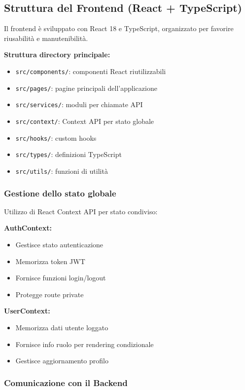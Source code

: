 \documentclass{report}
\begin{document}
\subsection{Struttura del Frontend (React + TypeScript)}

Il frontend è sviluppato con React 18 e TypeScript, organizzato per favorire 
riusabilità e manutenibilità.

\textbf{Struttura directory principale:}
\begin{itemize}
    \item \texttt{src/components/}: componenti React riutilizzabili
    \item \texttt{src/pages/}: pagine principali dell'applicazione
    \item \texttt{src/services/}: moduli per chiamate API
    \item \texttt{src/context/}: Context API per stato globale
    \item \texttt{src/hooks/}: custom hooks
    \item \texttt{src/types/}: definizioni TypeScript
    \item \texttt{src/utils/}: funzioni di utilità
\end{itemize}

\subsubsection{Gestione dello stato globale}

Utilizzo di React Context API per stato condiviso:

\textbf{AuthContext:}
\begin{itemize}
    \item Gestisce stato autenticazione
    \item Memorizza token JWT
    \item Fornisce funzioni login/logout
    \item Protegge route private
\end{itemize}

\textbf{UserContext:}
\begin{itemize}
    \item Memorizza dati utente loggato
    \item Fornisce info ruolo per rendering condizionale
    \item Gestisce aggiornamento profilo
\end{itemize}

\subsubsection{Comunicazione con il Backend}
\end{document}

